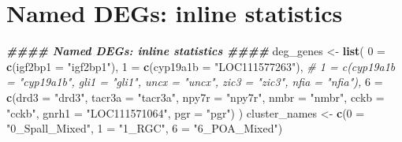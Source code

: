 \documentclass[
  landscape]{article}
\newenvironment{Shaded}{\begin{snugshade}}{\end{snugshade}}
\newcommand{\AttributeTok}[1]{\textcolor[rgb]{0.13,0.29,0.53}{#1}}
\newcommand{\CommentTok}[1]{\textcolor[rgb]{0.56,0.35,0.01}{\textit{#1}}}
\newcommand{\DocumentationTok}[1]{\textcolor[rgb]{0.56,0.35,0.01}{\textbf{\textit{#1}}}}
\newcommand{\FunctionTok}[1]{\textcolor[rgb]{0.13,0.29,0.53}{\textbf{#1}}}
\newcommand{\NormalTok}[1]{#1}
\newcommand{\OtherTok}[1]{\textcolor[rgb]{0.56,0.35,0.01}{#1}}
\newcommand{\StringTok}[1]{\textcolor[rgb]{0.31,0.60,0.02}{#1}}
\begin{document}
\section{Named DEGs: inline
statistics}\label{named-degs-inline-statistics}

\begin{Shaded}
\begin{Highlighting}[]
\DocumentationTok{\#\#\#\# Named DEGs: inline statistics \#\#\#\#}
\NormalTok{deg\_genes }\OtherTok{\textless{}{-}} \FunctionTok{list}\NormalTok{(}
  \StringTok{\textasciigrave{}}\AttributeTok{0}\StringTok{\textasciigrave{}} \OtherTok{=} \FunctionTok{c}\NormalTok{(}\AttributeTok{igf2bp1 =} \StringTok{"igf2bp1"}\NormalTok{),}
  \StringTok{\textasciigrave{}}\AttributeTok{1}\StringTok{\textasciigrave{}} \OtherTok{=} \FunctionTok{c}\NormalTok{(}\AttributeTok{cyp19a1b =} \StringTok{"LOC111577263"}\NormalTok{),}
  \CommentTok{\# \textasciigrave{}1\textasciigrave{} = c(cyp19a1b = "cyp19a1b", gli1 = "gli1", uncx = "uncx", zic3 = "zic3", nfia = "nfia"),}
  \StringTok{\textasciigrave{}}\AttributeTok{6}\StringTok{\textasciigrave{}} \OtherTok{=} \FunctionTok{c}\NormalTok{(}\AttributeTok{drd3 =} \StringTok{"drd3"}\NormalTok{, }\AttributeTok{tacr3a =} \StringTok{"tacr3a"}\NormalTok{, }\AttributeTok{npy7r =} \StringTok{"npy7r"}\NormalTok{, }\AttributeTok{nmbr =} \StringTok{"nmbr"}\NormalTok{,}
          \AttributeTok{cckb =} \StringTok{"cckb"}\NormalTok{, }\AttributeTok{gnrh1 =} \StringTok{"LOC111571064"}\NormalTok{, }\AttributeTok{pgr =} \StringTok{"pgr"}\NormalTok{)}
\NormalTok{)}
\NormalTok{cluster\_names }\OtherTok{\textless{}{-}} \FunctionTok{c}\NormalTok{(}\StringTok{\textasciigrave{}}\AttributeTok{0}\StringTok{\textasciigrave{}} \OtherTok{=} \StringTok{"0\_Spall\_Mixed"}\NormalTok{, }\StringTok{\textasciigrave{}}\AttributeTok{1}\StringTok{\textasciigrave{}} \OtherTok{=} \StringTok{"1\_RGC"}\NormalTok{, }\StringTok{\textasciigrave{}}\AttributeTok{6}\StringTok{\textasciigrave{}} \OtherTok{=} \StringTok{"6\_POA\_Mixed"}\NormalTok{)}


\end{Highlighting}
\end{Shaded}
\end{document}

